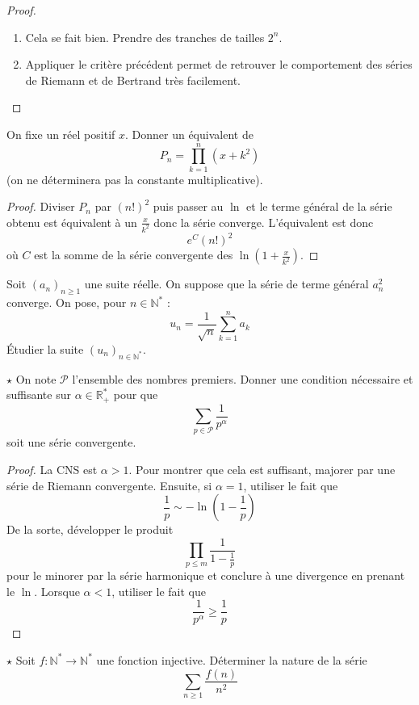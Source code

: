 \documentclass[french,a4paper]{article}
\newcommand{\N}{\mathbb{N}}
\newcommand{\R}{\mathbb{R}}
\newcommand{\st}{^*}
\theoremstyle{plain}
\theoremstyle{definition}
\theoremstyle{remark}
\begin{document}
\begin{proof}
	\begin{enumerate}
		\item Cela se fait bien. Prendre des tranches de tailles $2^n$.
		\item Appliquer le critère précédent permet de retrouver le comportement des séries de Riemann et de Bertrand très facilement.
	\end{enumerate}
\end{proof}

\begin{ex}[Moulin.19]{}
	On fixe un réel positif $x$. Donner un équivalent de $$P_n=\prod_{k=1}^{n}(x+k^2)$$ (on ne déterminera pas la constante multiplicative).
\end{ex}

\begin{proof}
	Diviser $P_n$ par $(n!)^2$ puis passer au $\ln$ et le terme général de la série obtenu est équivalent à un $\displaystyle\frac{x}{k^2}$ donc la série converge. L'équivalent est donc $$e^{C}(n!)^2$$ où $C$ est la somme de la série convergente des $\ln\left(1+\frac{x}{k^2}\right)$.
\end{proof}

\begin{ex}[Moulin.20]{}
	Soit $(a_n)_{n\geqslant 1}$ une suite réelle. On suppose que la série de terme général $a_n^2$ converge. On pose, pour $n\in\N\st$ : $$u_n=\frac{1}{\sqrt{n}}\sum_{k=1}^{n}a_k$$ Étudier la suite $(u_n)_{n\in\N\st}$.
\end{ex}

\begin{ex}[]{$\star$}
	On note $\mathcal{P}$ l'ensemble des nombres premiers. Donner une condition nécessaire et suffisante sur $\alpha\in\R_+\st$ pour que $$\sum_{p\in\mathcal{P}}\frac{1}{p^\alpha}$$ soit une série convergente.
\end{ex}

\begin{proof}
	La CNS est $\alpha >1$. Pour montrer que cela est suffisant, majorer par une série de Riemann convergente. Ensuite, si $\alpha=1$, utiliser le fait que $$\frac{1}{p}\sim -\ln\left(1-\frac{1}{p}\right)$$ De la sorte, développer le produit $$\prod_{p\leqslant m}\frac{1}{1-\frac{1}{p}}$$ pour le minorer par la série harmonique et conclure à une divergence en prenant le $\ln$. Lorsque $\alpha<1$, utiliser le fait que $$\frac{1}{p^\alpha}\geqslant\frac{1}{p}$$
\end{proof}

\begin{ex}[Morlot]{$\star$}
	Soit $f:\N\st\to\N\st$ une fonction injective. Déterminer la nature de la série $$\sum_{n\geqslant 1}\frac{f(n)}{n^2}$$
\end{ex}
\end{document}
